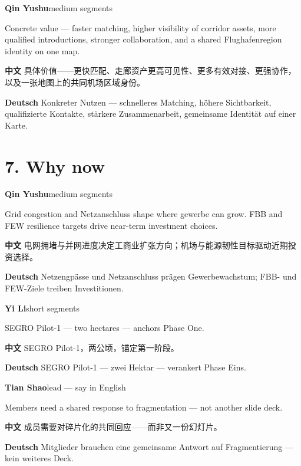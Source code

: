 \documentclass[11pt,a4paper]{ctexart}
\newenvironment{speakerblock}[2]{%
  \par\medskip
  {\color{berblue}\textbf{#1}}\hfill{\small\textcolor{bergrey}{#2}}\par
  \vspace{0.25em}
}{\par\medskip}
\begin{document}
\begin{speakerblock}{Qin Yushu}{medium segments}
\begin{englishbox}
Concrete value — faster matching, higher visibility of corridor assets, more qualified introductions, stronger collaboration, and a shared Flughafenregion identity on one map.
\end{englishbox}

\textbf{中文} 具体价值——更快匹配、走廊资产更高可见性、更多有效对接、更强协作，以及一张地图上的共同机场区域身份。

\textbf{Deutsch} Konkreter Nutzen — schnelleres Matching, höhere Sichtbarkeit, qualifizierte Kontakte, stärkere Zusammenarbeit, gemeinsame Identität auf einer Karte.
\end{speakerblock}



\section{7. Why now}

\begin{speakerblock}{Qin Yushu}{medium segments}
\begin{englishbox}
Grid congestion and Netzanschluss shape where gewerbe can grow. FBB and FEW resilience targets drive near-term investment choices.
\end{englishbox}

\textbf{中文} 电网拥堵与并网进度决定工商业扩张方向；机场与能源韧性目标驱动近期投资选择。

\textbf{Deutsch} Netzengpässe und Netzanschluss prägen Gewerbewachstum; FBB- und FEW-Ziele treiben Investitionen.
\end{speakerblock}


\begin{speakerblock}{Yi Li}{short segments}
\begin{englishbox}
SEGRO Pilot-1 — two hectares — anchors Phase One.
\end{englishbox}

\textbf{中文} SEGRO Pilot-1，两公顷，锚定第一阶段。

\textbf{Deutsch} SEGRO Pilot-1 — zwei Hektar — verankert Phase Eins.
\end{speakerblock}


\begin{speakerblock}{Tian Shao}{lead — say in English}
\begin{englishbox}
Members need a shared response to fragmentation — not another slide deck.
\end{englishbox}

\textbf{中文} 成员需要对碎片化的共同回应——而非又一份幻灯片。

\textbf{Deutsch} Mitglieder brauchen eine gemeinsame Antwort auf Fragmentierung — kein weiteres Deck.
\end{speakerblock}
\end{document}
